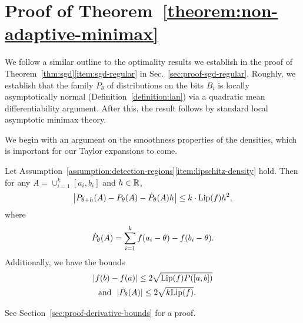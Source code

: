 
\section{Proof of Theorem~\ref{theorem:non-adaptive-minimax}}
\label{sec:proof-non-adaptive-minimax}

We follow a similar outline to the optimality results we establish
in the proof of Theorem~\ref{thm:sgd}\eqref{item:sgd-regular} in
Sec.~\ref{sec:proof-sgd-regular}.
Roughly, we establish that the family $P_\theta$ of distributions
on the bits $B_i$ is locally asymptotically normal
(Definition~\ref{definition:lan}) via a quadratic
mean differentiability argument. After this, the result
follows by standard local asymptotic minimax theory.

We begin with an argument on the smoothness properties of the densities,
which is important for our Taylor expansions to come.
\begin{lemma}
  \label{lemma:derivative-bounds}
  Let Assumption~\ref{assumption:detection-regions}\eqref{item:lipschitz-density} hold. Then for any $A = \cup_{i = 1}^k
  [a_i, b_i]$ and $h \in \mathbb{R}$,
  \begin{align}
    \left|P_{\theta + h}(A) - P_\theta(A) - \dot{P}_\theta(A) h \right| \leq 
    k \cdot {\rm \textup{Lip}}(f) h^2,
    \label{eqn:expansion-dPtheta}
  \end{align}
  where
  \begin{align*}
    \dot{P}_\theta(A) = \sum_{i = 1}^k f(a_i - \theta) - f(b_i - \theta).
  \end{align*}
  Additionally, we have the bounds
  \begin{align}
    & \label{eqn:bound-density-diffs}
    |f(b) - f(a)| \le 2 \sqrt{{\rm \textup{Lip}}(f) P([a, b])} \\
    & 
    ~~ \mbox{and} ~~
    |\dot{P}_\theta(A)| \le 2 \sqrt{k {\rm \textup{Lip}}(f)}. \nonumber
  \end{align}
\end{lemma}
\noindent
See Section~\ref{sec:proof-derivative-bounds} for a proof.

